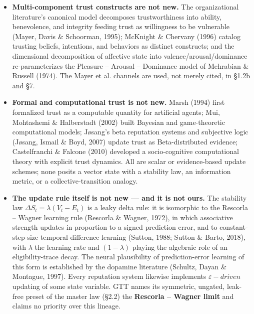 \documentclass[11pt,twocolumn]{article}
\theoremstyle{gttdef}
\theoremstyle{gttplain}
\begin{document}
\begin{itemize}

\item \textbf{Multi-component trust constructs are not new.} The organizational literature's canonical model decomposes trustworthiness into ability, benevolence, and integrity feeding trust as willingness to be vulnerable (Mayer, Davis \& Schoorman, 1995); McKnight \& Chervany (1996) catalog trusting beliefs, intentions, and behaviors as distinct constructs; and the dimensional decomposition of affective state into valence/arousal/dominance re-parameterizes the Pleasure -- Arousal -- Dominance model of Mehrabian \& Russell (1974). The Mayer et al. channels are used, not merely cited, in \S{}1.2b and \S{}7.

\item \textbf{Formal and computational trust is not new.} Marsh (1994) first formalized trust as a computable quantity for artificial agents; Mui, Mohtashemi \& Halberstadt (2002) built Bayesian and game-theoretic computational models; Jøsang's beta reputation systems and subjective logic (Jøsang, Ismail \& Boyd, 2007) update trust as Beta-distributed evidence; Castelfranchi \& Falcone (2010) developed a socio-cognitive computational theory with explicit trust dynamics. All are scalar or evidence-based update schemes; none posits a vector state with a stability law, an information metric, or a collective-transition analogy.

\item \textbf{The update rule itself is not new --- and it is not ours.} The stability law $\Delta S_t = \lambda(V_t - E_t)$ is a leaky delta rule: it is isomorphic to the Rescorla -- Wagner learning rule (Rescorla \& Wagner, 1972), in which associative strength updates in proportion to a signed prediction error, and to constant-step-size temporal-difference learning (Sutton, 1988; Sutton \& Barto, 2018), with $\lambda$ the learning rate and $(1 - \lambda)$ playing the algebraic role of an eligibility-trace decay. The neural plausibility of prediction-error learning of this form is established by the dopamine literature (Schultz, Dayan \& Montague, 1997). Every reputation system likewise implements $\varepsilon-driven$ updating of some state variable. GTT names its symmetric, ungated, leak-free preset of the master law (\S{}2.2) the \textbf{Rescorla -- Wagner limit} and claims no priority over this lineage.


\end{itemize}
\end{document}
